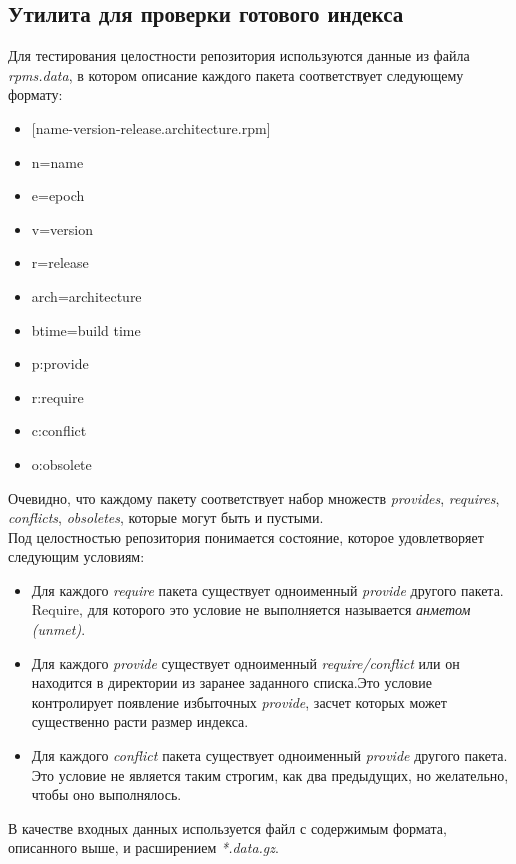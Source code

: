 \subsection{Утилита для проверки готового индекса}
Для тестирования целостности репозитория используются данные из файла \textit{rpms.data},
в котором описание каждого пакета соответствует следующему формату:
\begin{itemize}
\item{[name-version-release.architecture.rpm] }
\item{n=name} 
\item{e=epoch}
\item{v=version}
\item{r=release}
\item{arch=architecture}
\item{btime=build time}
\item{p:provide}
\item{r:require}
\item{c:conflict}
\item{o:obsolete}
\end{itemize}
Очевидно, что каждому пакету соответствует набор множеств \textit{provides},
\textit{requires}, \textit{conflicts}, \textit{obsoletes}, которые могут быть и пустыми.\\

Под целостностью репозитория понимается состояние, которое удовлетворяет следующим
условиям:
\begin{itemize}
\item{Для каждого \textit{require} пакета существует одноименный \textit{provide} 
другого пакета. Require, для которого это условие не выполняется
называется \textit{анметом (unmet)}. }
\item{Для каждого \textit{provide} существует одноименный \textit{require/conflict} или
он находится в директории из заранее заданного списка.Это условие 
контролирует появление избыточных \textit{provide}, засчет которых %
может существенно расти размер индекса.}
\item{Для каждого \textit{conflict} пакета существует одноименный \textit{provide} 
другого пакета. Это условие не является таким строгим, как два предыдущих,
но желательно, чтобы оно выполнялось. }
\end{itemize}

В качестве входных данных используется файл с содержимым формата, описанного выше,
и расширением \textit{*.data.gz}.

